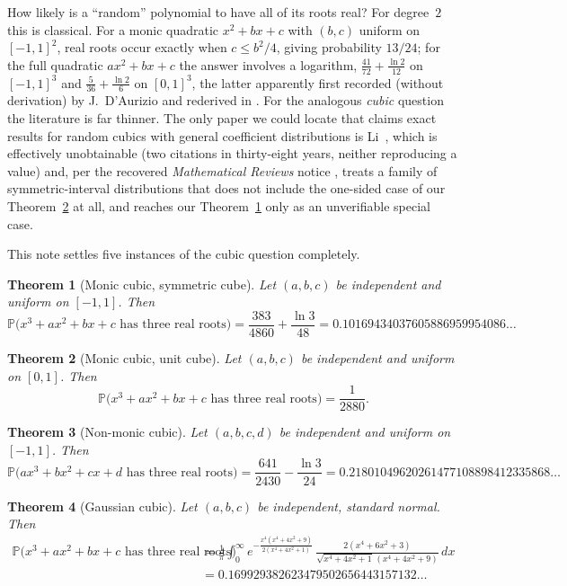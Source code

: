 \documentclass[11pt,reqno]{amsart}
\theoremstyle{plain}
\newtheorem{theorem}{Theorem}
\theoremstyle{remark}
\newcommand{\Prb}{\mathbb{P}}
\begin{document}
How likely is a ``random'' polynomial to have all of its roots real? For
degree~$2$ this is classical. For a monic quadratic $x^2+bx+c$ with $(b,c)$
uniform on $[-1,1]^2$, real roots occur exactly when $c\le b^2/4$, giving
probability $13/24$; for the full quadratic $ax^2+bx+c$ the answer involves a
logarithm, $\tfrac{41}{72}+\tfrac{\ln 2}{12}$ on $[-1,1]^3$ and
$\tfrac{5}{36}+\tfrac{\ln 2}{6}$ on $[0,1]^3$, the latter apparently first
recorded (without derivation) by J.~D'Aurizio and rederived in
\cite{haldar-chakraborty}. For the analogous \emph{cubic} question the
literature is far thinner. The only paper we could locate that claims exact
results for random cubics with general coefficient distributions is
Li~\cite{li1988}, which is effectively unobtainable (two citations in
thirty-eight years, neither reproducing a value) and, per the recovered
\emph{Mathematical Reviews} notice \cite{li1988-mr}, treats a family of
symmetric-interval distributions that does not include the one-sided case of
our Theorem~\ref{thm:unit-cube} at all, and reaches our Theorem~\ref{thm:sym-cube}
only as an unverifiable special case.

This note settles five instances of the cubic question completely.

\begin{theorem}[Monic cubic, symmetric cube] \label{thm:sym-cube}
Let $(a,b,c)$ be independent and uniform on $[-1,1]$. Then
\[
  \Prb\bigl(x^3+ax^2+bx+c \text{ has three real roots}\bigr)
  = \frac{383}{4860}+\frac{\ln 3}{48}
  = 0.10169434037605886959954086\ldots
\]
\end{theorem}

\begin{theorem}[Monic cubic, unit cube] \label{thm:unit-cube}
Let $(a,b,c)$ be independent and uniform on $[0,1]$. Then
\[
  \Prb\bigl(x^3+ax^2+bx+c \text{ has three real roots}\bigr) = \frac{1}{2880}.
\]
\end{theorem}

\begin{theorem}[Non-monic cubic] \label{thm:nonmonic}
Let $(a,b,c,d)$ be independent and uniform on $[-1,1]$. Then
\[
  \Prb\bigl(ax^3+bx^2+cx+d \text{ has three real roots}\bigr)
  = \frac{641}{2430}-\frac{\ln 3}{24}
  = 0.21801049620261477108898412335868\ldots
\]
\end{theorem}

\begin{theorem}[Gaussian cubic] \label{thm:gaussian}
Let $(a,b,c)$ be independent, standard normal. Then
\begin{align*}
  \Prb\bigl(x^3+ax^2+bx+c \text{ has three real roots}\bigr)
  &= \frac{1}{\pi}\int_0^\infty
    e^{-\frac{x^4(x^4+4x^2+9)}{2(x^4+4x^2+1)}}\,
    \frac{2(x^4+6x^2+3)}{\sqrt{x^4+4x^2+1}\,(x^4+4x^2+9)}\,dx \\
  &= 0.169929382623479502656443157132\ldots
\end{align*}
\end{theorem}
\end{document}
